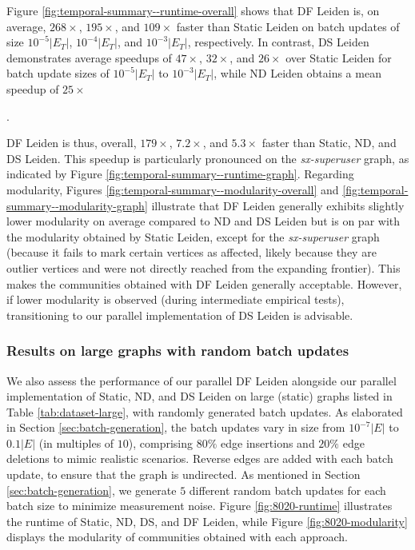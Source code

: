 Figure \ref{fig:temporal-summary--runtime-overall} shows that DF Leiden is, on average, $268\times$, $195\times$, and $109\times$ faster than Static Leiden on batch updates of size $10^{-5}|E_T|$, $10^{-4}|E_T|$, and $10^{-3}|E_T|$, respectively. In contrast, DS Leiden demonstrates average speedups of $47\times$, $32\times$, and $26\times$ over Static Leiden for batch update sizes of $10^{-5}|E_T|$ to $10^{-3}|E_T|$, while ND Leiden obtains a mean speedup of $25\times$. DF Leiden is thus, overall, $179\times$, $7.2\times$, and $5.3\times$ faster than Static, ND, and DS Leiden. This speedup is particularly pronounced on the \textit{sx-superuser} graph, as indicated by Figure \ref{fig:temporal-summary--runtime-graph}. Regarding modularity, Figures \ref{fig:temporal-summary--modularity-overall} and \ref{fig:temporal-summary--modularity-graph} illustrate that DF Leiden generally exhibits slightly lower modularity on average compared to ND and DS Leiden but is on par with the modularity obtained by Static Leiden, except for the \textit{sx-superuser} graph (because it fails to mark certain vertices as affected, likely because they are outlier vertices and were not directly reached from the expanding frontier). This makes the communities obtained with DF Leiden generally acceptable. However, if lower modularity is observed (during intermediate empirical tests), transitioning to our parallel implementation of DS Leiden is advisable.


\subsubsection{Results on large graphs with random batch updates}

We also assess the performance of our parallel DF Leiden alongside our parallel implementation of Static, ND, and DS Leiden on large (static) graphs listed in Table \ref{tab:dataset-large}, with randomly generated batch updates. As elaborated in Section \ref{sec:batch-generation}, the batch updates vary in size from $10^{-7}|E|$ to $0.1|E|$ (in multiples of $10$), comprising $80\%$ edge insertions and $20\%$ edge deletions to mimic realistic scenarios. Reverse edges are added with each batch update, to ensure that the graph is undirected. As mentioned in Section \ref{sec:batch-generation}, we generate $5$ different random batch updates for each batch size to minimize measurement noise. Figure \ref{fig:8020-runtime} illustrates the runtime of Static, ND, DS, and DF Leiden, while Figure \ref{fig:8020-modularity} displays the modularity of communities obtained with each approach.

